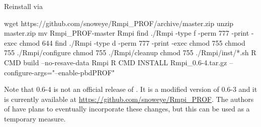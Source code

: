 Reinstall  via
\begin{Command}
wget https://github.com/snoweye/Rmpi_PROF/archive/master.zip
unzip master.zip
mv Rmpi_PROF-master Rmpi
find ./Rmpi -type f -perm 777 -print -exec chmod 644 {} \;
find ./Rmpi -type d -perm 777 -print -exec chmod 755 {} \;
chmod 755 ./Rmpi/configure
chmod 755 ./Rmpi/cleanup
chmod 755 ./Rmpi/inst/*.sh
R CMD build --no-resave-data Rmpi
R CMD INSTALL Rmpi_0.6-4.tar.gz --configure-args="--enable-pbdPROF"
\end{Command}
Note that {\color{red} 0.6-4} is not an official release of .
It is a modified version of 0.6-3 and it is currently available at
\url{https://github.com/snoweye/Rmpi_PROF}.  The authors of  have plans 
to eventually incorporate these changes, but this can be used as a temporary 
measure.
